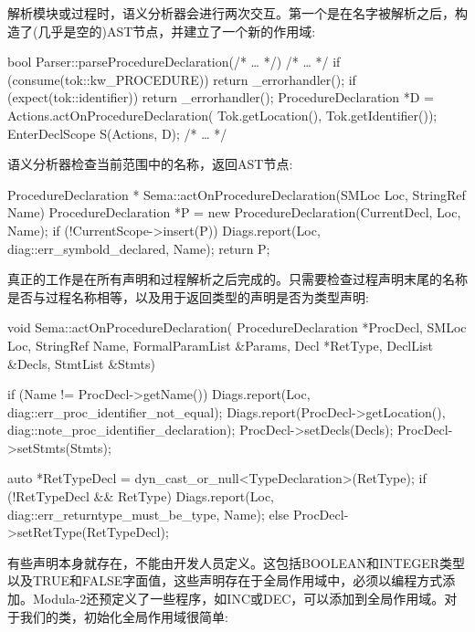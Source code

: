 解析模块或过程时，语义分析器会进行两次交互。第一个是在名字被解析之后，构造了(几乎是空的)AST节点，并建立了一个新的作用域:

\begin{cpp}
bool Parser::parseProcedureDeclaration(/* … */) {
    /* … */
    if (consume(tok::kw_PROCEDURE)) return _errorhandler();
    if (expect(tok::identifier)) return _errorhandler();
    ProcedureDeclaration *D =
        Actions.actOnProcedureDeclaration(
            Tok.getLocation(), Tok.getIdentifier());
    EnterDeclScope S(Actions, D);
    /* … */
}
\end{cpp}

语义分析器检查当前范围中的名称，返回AST节点:

\begin{cpp}
ProcedureDeclaration *
Sema::actOnProcedureDeclaration(SMLoc Loc, StringRef Name) {
    ProcedureDeclaration *P =
    new ProcedureDeclaration(CurrentDecl, Loc, Name);
    if (!CurrentScope->insert(P))
        Diags.report(Loc, diag::err_symbold_declared, Name);
    return P;
}
\end{cpp}

真正的工作是在所有声明和过程解析之后完成的。只需要检查过程声明末尾的名称是否与过程名称相等，以及用于返回类型的声明是否为类型声明:

\begin{cpp}
void Sema::actOnProcedureDeclaration(
        ProcedureDeclaration *ProcDecl, SMLoc Loc,
        StringRef Name, FormalParamList &Params, Decl *RetType,
        DeclList &Decls, StmtList &Stmts) {

    if (Name != ProcDecl->getName()) {
        Diags.report(Loc, diag::err_proc_identifier_not_equal);
        Diags.report(ProcDecl->getLocation(),
                     diag::note_proc_identifier_declaration);
    }
    ProcDecl->setDecls(Decls);
    ProcDecl->setStmts(Stmts);

    auto *RetTypeDecl =
    dyn_cast_or_null<TypeDeclaration>(RetType);
    if (!RetTypeDecl && RetType)
        Diags.report(Loc, diag::err_returntype_must_be_type, Name);
    else
        ProcDecl->setRetType(RetTypeDecl);
}
\end{cpp}

有些声明本身就存在，不能由开发人员定义。这包括BOOLEAN和INTEGER类型以及TRUE和FALSE字面值，这些声明存在于全局作用域中，必须以编程方式添加。Modula-2还预定义了一些程序，如INC或DEC，可以添加到全局作用域。对于我们的类，初始化全局作用域很简单:

